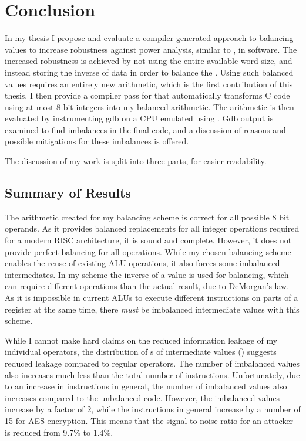 \chapter{Conclusion}
\label{conclusion}
In my thesis I propose and evaluate a compiler generated approach to balancing values to increase robustness against power analysis, similar to \dual{}, in software.
The increased robustness is achieved by not using the entire available word size, and instead storing the inverse of data in order to balance the \hammingw{}.
Using such balanced values requires an entirely new arithmetic, which is the first contribution of this thesis.
I then provide a compiler pass for \llvm{} that automatically transforms C code using at most 8 bit integers into my balanced arithmetic.
The arithmetic is then evaluated by instrumenting gdb on a CPU emulated using \qemu{}.
Gdb output is examined to find imbalances in the final code, and a discussion of reasons and possible mitigations for these imbalances is offered.

The discussion of my work is split into three parts, for easier readability.

\section{Summary of Results}
The arithmetic created for my balancing scheme is correct for all possible 8 bit operands.
As it provides balanced replacements for all integer operations required for a modern RISC architecture, it is sound and complete.
However, it does not provide perfect balancing for all operations.
While my chosen balancing scheme enables the reuse of existing ALU operations, it also forces some imbalanced intermediates.
In my scheme the inverse of a value is used for balancing, which can require different operations than the actual result, due to DeMorgan's law.
As it is impossible in current ALUs to execute different instructions on parts of a register at the same time, there \emph{must} be imbalanced intermediate values with this scheme.

While I cannot make hard claims on the reduced information leakage of my individual operators, the distribution of \hammingw{}s of intermediate values () suggests reduced leakage compared to regular operators.
The number of imbalanced values also increases much less than the total number of instructions.
Unfortunately, due to an increase in instructions in general, the number of imbalanced values also increases compared to the unbalanced code.
However, the imbalanced values increase by a factor of 2, while the instructions in general increase by a number of 15 for AES encryption.
This means that the signal-to-noise-ratio for an attacker is reduced from 9.7\% to 1.4\%.


